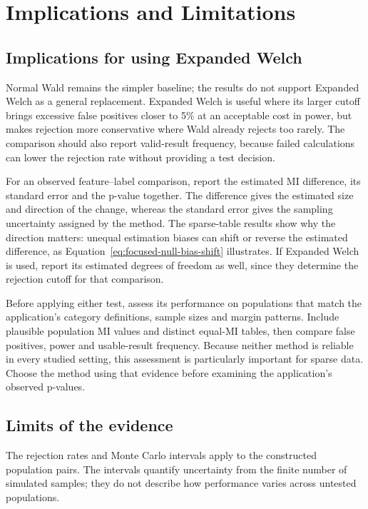 \chapter{Implications and Limitations}
\label{chap:discussion}

\section{Implications for using Expanded Welch}

Normal Wald remains the simpler baseline; the results do not support
Expanded Welch as a general replacement. Expanded Welch is useful where
its larger cutoff brings excessive false positives closer to 5\% at
an acceptable cost in power, but makes rejection more conservative
where Wald already rejects too rarely. The comparison
should also report valid-result frequency, because failed calculations
can lower the rejection rate without providing a test decision.

For an observed feature--label comparison, report the estimated MI
difference, its standard error and the p-value together. The difference
gives the estimated size and direction of the change, whereas the standard error
gives the sampling uncertainty assigned by the method. The sparse-table
results show why the direction matters: unequal estimation biases can
shift or reverse the estimated difference, as
Equation~\eqref{eq:focused-null-bias-shift} illustrates. If Expanded
Welch is used, report its estimated degrees of freedom as well, since
they determine the rejection cutoff for that comparison.

Before applying either test, assess its performance on populations that
match the application's category definitions, sample sizes and margin
patterns. Include plausible population MI values and distinct equal-MI
tables, then compare false positives, power and usable-result frequency.
Because neither method is reliable in every studied setting, this
assessment is particularly important for sparse data. Choose the method using
that evidence before examining the application's observed p-values.

\begin{samepage}
\section{Limits of the evidence}

The rejection rates and Monte Carlo intervals apply to the constructed
population pairs. The intervals quantify uncertainty from the finite number
of simulated samples; they do not describe how performance varies across
untested populations.
\par
\end{samepage}

